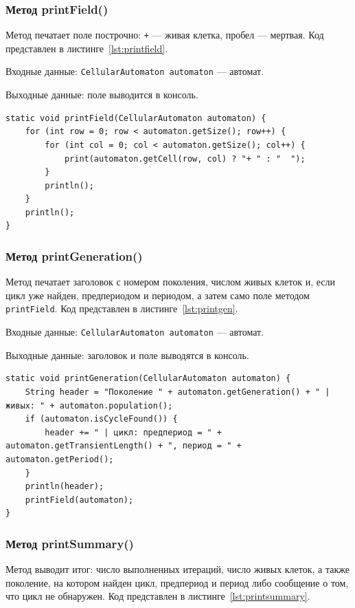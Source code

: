 \documentclass[a4paper,14pt]{extarticle}
\begin{document}
\subsubsection*{Метод printField()}

Метод печатает поле построчно: \texttt{+} --- живая клетка, пробел --- мертвая. Код представлен в листинге~\ref{lst:printfield}.

Входные данные: \texttt{CellularAutomaton automaton} --- автомат.

Выходные данные: поле выводится в консоль.

\begin{lstlisting}[caption={Метод printField()}, label={lst:printfield}]
static void printField(CellularAutomaton automaton) {
	for (int row = 0; row < automaton.getSize(); row++) {
		for (int col = 0; col < automaton.getSize(); col++) {
			print(automaton.getCell(row, col) ? "+ " : "  ");
		}
		println();
	}
	println();
}
\end{lstlisting}

\subsubsection*{Метод printGeneration()}

Метод печатает заголовок с номером поколения, числом живых клеток и, если цикл уже найден, предпериодом и периодом, а затем само поле методом \texttt{printField}. Код представлен в листинге~\ref{lst:printgen}.

Входные данные: \texttt{CellularAutomaton automaton} --- автомат.

Выходные данные: заголовок и поле выводятся в консоль.

\begin{lstlisting}[caption={Метод printGeneration()}, label={lst:printgen}]
static void printGeneration(CellularAutomaton automaton) {
	String header = "Поколение " + automaton.getGeneration() + " | живых: " + automaton.population();
	if (automaton.isCycleFound()) {
		header += " | цикл: предпериод = " + automaton.getTransientLength() + ", период = " + automaton.getPeriod();
	}
	println(header);
	printField(automaton);
}
\end{lstlisting}

\subsubsection*{Метод printSummary()}

Метод выводит итог: число выполненных итераций, число живых клеток, а также поколение, на котором найден цикл, предпериод и период либо сообщение о том, что цикл не обнаружен. Код представлен в листинге~\ref{lst:printsummary}.
\end{document}
